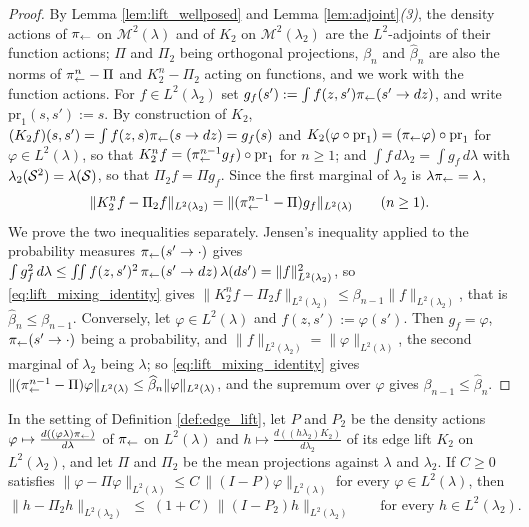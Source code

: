 \begin{proof}
By Lemma \ref{lem:lift_wellposed} and Lemma \ref{lem:adjoint}\emph{(3)}, the density actions of $\pi_{\leftarrow}$ on $\mathcal M^2(\lambda)$ and of $K_2$ on $\mathcal M^2(\lambda_2)$ are the $L^2$-adjoints of their function actions; $\Pi$ and $\Pi_2$ being orthogonal projections, $\beta_n$ and $\widehat\beta_n$ are also the norms of $\pi_{\leftarrow}^n-\Pi$ and $K_2^n-\Pi_2$ acting on functions, and we work with the function actions. For $f\in L^2(\lambda_2)$ set $g_f(s') := \int f(z,s')\pi_{\leftarrow}(s'\rightarrow dz)$, and write $\mathrm{pr}_1(s,s'):=s$. By construction of $K_2$, $(K_2f)(s,s')=\int f(z,s)\pi_{\leftarrow}(s\rightarrow dz)=g_f(s)$ and $K_2(\varphi\circ\mathrm{pr}_1)=(\pi_{\leftarrow}\varphi)\circ\mathrm{pr}_1$ for $\varphi\in L^2(\lambda)$, so that $K_2^n f = (\pi_{\leftarrow}^{n-1} g_f)\circ\mathrm{pr}_1$ for $n\geq1$; and $\int f\,d\lambda_2=\int g_f\,d\lambda$ with $\lambda_2(\mathcal S^2)=\lambda(\mathcal S)$, so that $\Pi_2 f = \Pi g_f$. Since the first marginal of $\lambda_2$ is $\lambda\pi_{\leftarrow}=\lambda$,
\begin{equation}\label{eq:lift_mixing_identity}
    \|K_2^nf - \Pi_2 f\|_{L^2(\lambda_2)} = \|(\pi_{\leftarrow}^{n-1}-\Pi)g_f\|_{L^2(\lambda)}\qquad(n\geq1).
\end{equation}
We prove the two inequalities separately. Jensen's inequality applied to the probability measures $\pi_{\leftarrow}(s'\rightarrow\cdot)$ gives $\int g_f^2\,d\lambda\leq\iint f(z,s')^2\,\pi_{\leftarrow}(s'\rightarrow dz)\,\lambda(ds')=\|f\|^2_{L^2(\lambda_2)}$, so \eqref{eq:lift_mixing_identity} gives $\|K_2^nf - \Pi_2 f\|_{L^2(\lambda_2)}\leq\beta_{n-1}\|f\|_{L^2(\lambda_2)}$, that is $\widehat\beta_n\leq\beta_{n-1}$. Conversely, let $\varphi\in L^2(\lambda)$ and $f(z,s'):=\varphi(s')$. Then $g_f=\varphi$, $\pi_{\leftarrow}(s'\rightarrow\cdot)$ being a probability, and $\|f\|_{L^2(\lambda_2)}=\|\varphi\|_{L^2(\lambda)}$, the second marginal of $\lambda_2$ being $\lambda$; so \eqref{eq:lift_mixing_identity} gives $\|(\pi_{\leftarrow}^{n-1}-\Pi)\varphi\|_{L^2(\lambda)}\leq\widehat\beta_n\|\varphi\|_{L^2(\lambda)}$, and the supremum over $\varphi$ gives $\beta_{n-1}\leq\widehat\beta_n$.
\end{proof}

\begin{lemma}\label{lem:lift_coercivity}
In the setting of Definition \ref{def:edge_lift}, let $P$ and $P_2$ be the density actions $\varphi\mapsto\frac{d((\varphi\lambda)\pi_{\leftarrow})}{d\lambda}$ of $\pi_{\leftarrow}$ on $L^2(\lambda)$ and $h\mapsto\frac{d((h\lambda_2)K_2)}{d\lambda_2}$ of its edge lift $K_2$ on $L^2(\lambda_2)$, and let $\Pi$ and $\Pi_2$ be the mean projections against $\lambda$ and $\lambda_2$. If $C\geq0$ satisfies $\|\varphi-\Pi\varphi\|_{L^2(\lambda)}\leq C\,\|(I-P)\varphi\|_{L^2(\lambda)}$ for every $\varphi\in L^2(\lambda)$, then
\begin{equation*}
    \|h-\Pi_2h\|_{L^2(\lambda_2)}\;\leq\;(1+C)\,\|(I-P_2)h\|_{L^2(\lambda_2)}\qquad\text{for every }h\in L^2(\lambda_2).
\end{equation*}
\end{lemma}

